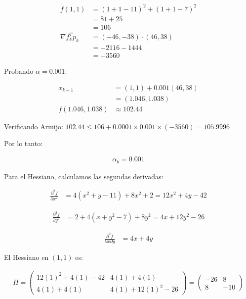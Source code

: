 \documentclass{article}
\begin{document}
\begin{align}
    f(1,1) &= (1+1-11)^2 + (1+1-7)^2 \\
    &= 81 + 25 \\
    &= 106 \\
    \nabla f_k^T p_k &= (-46, -38) \cdot (46, 38) \\
    &= -2116 - 1444  \\
    &= -3560
\end{align}

Probando $\alpha = 0.001$:

\begin{align}
    x_{k+1} &= (1,1) + 0.001(46, 38) \\
    &= (1.046, 1.038)\\
    f(1.046, 1.038) &\approx 102.44
\end{align}

Verificando Armijo: $102.44 \leq 106 + 0.0001 \times 0.001 \times (-3560) = 105.9996$

Por lo tanto:

\begin{align}
    \alpha_k = 0.001
\end{align}

Para el Hessiano, calculamos las segundas derivadas:

\begin{align}
    \frac{\partial^2 f}{\partial x^2} &= 4(x^2+y-11) + 8x^2 + 2 = 12x^2 + 4y - 42
\end{align}

\begin{align}
    \frac{\partial^2 f}{\partial y^2} &= 2 + 4(x+y^2-7) + 8y^2 = 4x + 12y^2 - 26
\end{align}

\begin{align}
    \frac{\partial^2 f}{\partial x \partial y} &= 4x + 4y
\end{align}

El Hessiano en $(1,1)$ es:

\begin{align}
    H = \begin{pmatrix}
        12(1)^2 + 4(1) - 42 & 4(1) + 4(1) \\
        4(1) + 4(1) & 4(1) + 12(1)^2 - 26
    \end{pmatrix} = \begin{pmatrix}
        -26 & 8 \\
        8 & -10
    \end{pmatrix}
\end{align}
\end{document}
